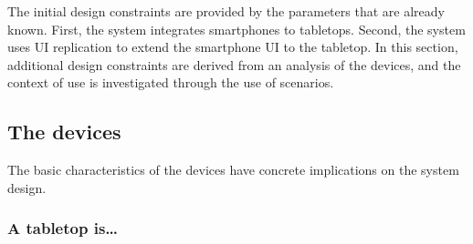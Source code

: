 The initial design constraints are provided by the parameters that are already known.
First, the system integrates smartphones to tabletops.
Second, the system uses UI replication to extend the smartphone UI to the tabletop.
In this section, additional design constraints are derived from an analysis of the devices, and the context of use is investigated through the use of scenarios.



\subsection{The devices}

The basic characteristics of the devices have concrete implications on the system design.

\subsubsection{A tabletop is\ldots}

